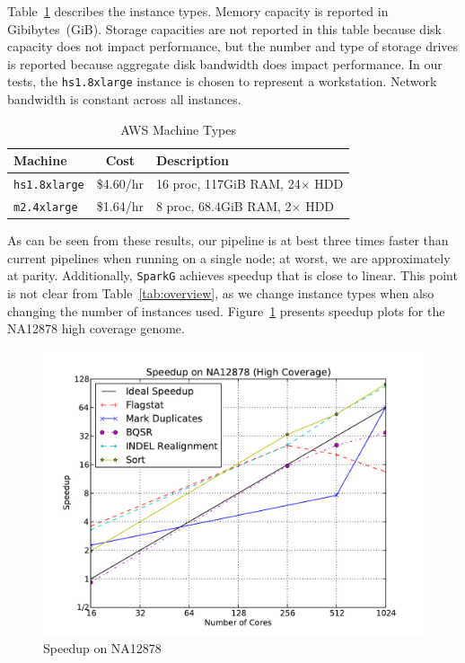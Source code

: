 \documentclass[10pt]{report} %
\begin{document}
Table~\ref{tab:machines} describes the instance types. Memory capacity is reported in Gibibytes~(GiB).
Storage capacities are not reported in this table because disk
capacity does not impact performance, but the number and type of storage drives is reported because
aggregate disk bandwidth does impact performance. In our tests, the \texttt{hs1.8xlarge} instance is
chosen to represent a workstation. Network bandwidth is constant across all instances.

\begin{table}[h]
\caption{AWS Machine Types}
\label{tab:machines}
\begin{center}
\begin{tabular}{ l c l }
\hline
\bf Machine & \bf Cost & \bf Description \\
\hline
\hline
\texttt{hs1.8xlarge} & \$4.60/hr & 16 proc, 117GiB RAM, 24$\times$ HDD \\
\texttt{m2.4xlarge} & \$1.64/hr & 8 proc, 68.4GiB RAM, 2$\times$ HDD \\
\hline
\end{tabular}
\end{center}
\end{table}

As can be seen from these results, our pipeline is at best three times faster than current pipelines when running
on a single node; at worst, we are approximately at parity. Additionally, \texttt{SparkG} achieves speedup that is
close to linear. This point is not clear from Table~\ref{tab:overview}, as we change instance types when also
changing the number of instances used. Figure~\ref{fig:speedup} presents speedup plots for the NA12878 high
coverage genome.

\begin{figure}[h]
\begin{center}
\includegraphics[width=0.99\linewidth]{graphs/speedup_na12878.pdf}
\end{center}
\caption{Speedup on NA12878}
\label{fig:speedup}
\end{figure}
\end{document}

